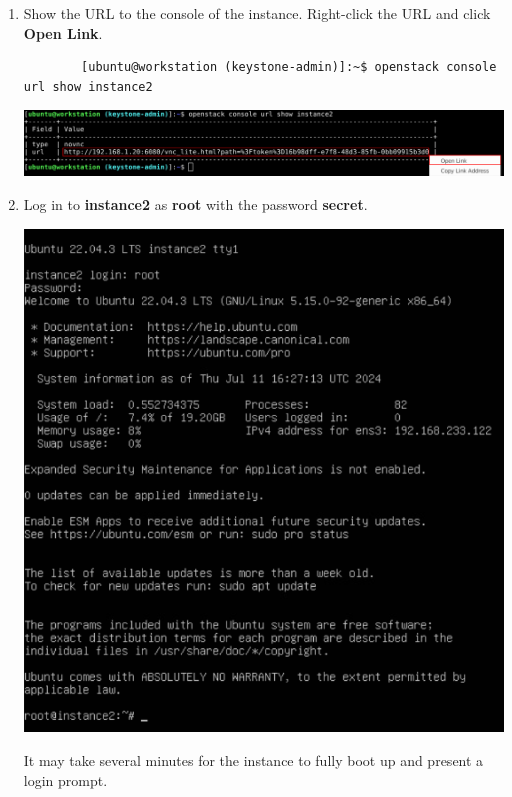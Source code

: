 \documentclass[letterpaper, 12pt]{article}
\begin{document}
\begin{enumerate}
    \item Show the URL to the console of the instance. Right-click the URL and click \textbf{Open Link}.
    \begin{lstlisting}
        [ubuntu@workstation (keystone-admin)]:~$ openstack console url show instance2
    \end{lstlisting}

    \begin{center}
        \includegraphics[width=\linewidth]{images/part2/step5.png}
    \end{center}

    \item Log in to \textbf{instance2} as \textbf{root} with the password \textbf{secret}.
    
    \begin{center}
        \includegraphics[width=\linewidth]{images/part2/step6.png}
    \end{center}

    \begin{notebox}
        It may take several minutes for the instance to fully boot up and present a login prompt.
    \end{notebox}


\end{enumerate}
\end{document}
